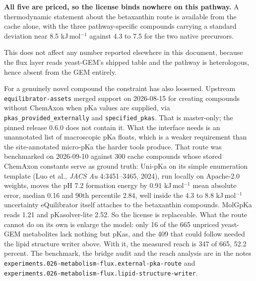 \textbf{All five are priced, so the license binds nowhere on this pathway.} A thermodynamic
statement about the betaxanthin route is available from the cache alone, with the three
pathway-specific compounds carrying a standard deviation near 8.5 kJ\,mol$^{-1}$ against
4.3 to 7.5 for the two native precursors.

This does not affect any number reported elsewhere in this document, because the flux layer
reads yeast-GEM's shipped table and the pathway is heterologous, hence absent from the GEM
entirely.

For a genuinely novel compound the constraint has also loosened. Upstream
\texttt{equilibrator-assets} merged support on 2026-08-15 for creating compounds without
ChemAxon when pKa values are supplied, via \texttt{pkas\_provided\_externally} and
\texttt{specified\_pkas}. That is master-only; the pinned release 0.6.0 does not contain it.
What the interface needs is an unannotated list of macroscopic pKa floats, which is a
weaker requirement than the site-annotated micro-pKa the harder tools produce. That route
was benchmarked on 2026-09-10 against 300 cache compounds whose stored ChemAxon constants
serve as ground truth: Uni-pKa on its simple enumeration template (Luo et al., \emph{JACS
Au} 4:3451--3465, 2024), run locally on Apache-2.0 weights, moves the pH 7.2 formation
energy by 0.91 kJ\,mol$^{-1}$ mean absolute error, median 0.16 and 90th percentile 2.84,
well inside the 4.3 to 8.8 kJ\,mol$^{-1}$ uncertainty eQuilibrator itself attaches to the
betaxanthin compounds. MolGpKa reads 1.21 and pKasolver-lite 2.52. So the license is
replaceable. What the route cannot do on its own is enlarge the
model: only 16 of the 665 unpriced yeast-GEM metabolites lack nothing but pKas, and the 409
that could follow needed the lipid structure writer above. With it, the measured reach is
347 of 665, 52.2 percent. The benchmark, the bridge audit and the reach analysis are in the
notes \texttt{experiments.026-metabolism-flux.external-pka-route} and
\texttt{experiments.026-metabolism-flux.lipid-structure-writer}.
